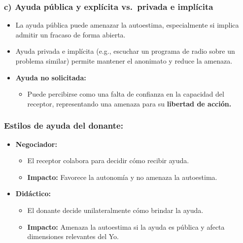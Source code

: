 \documentclass[
]{book}
\providecommand{\tightlist}{%
  \setlength{\itemsep}{0pt}\setlength{\parskip}{0pt}}
\begin{document}
\subsubsection{\texorpdfstring{\textbf{c) Ayuda pública y explícita vs.~privada e implícita}}{c) Ayuda pública y explícita vs.~privada e implícita}}\label{c-ayuda-puxfablica-y-expluxedcita-vs.-privada-e-impluxedcita}

\begin{itemize}
\tightlist
\item
  La ayuda pública puede amenazar la autoestima, especialmente si implica admitir un fracaso de forma abierta.
\item
  Ayuda privada e implícita (e.g., escuchar un programa de radio sobre un problema similar) permite mantener el anonimato y reduce la amenaza.
\item
  \textbf{Ayuda no solicitada:}

  \begin{itemize}
  \tightlist
  \item
    Puede percibirse como una falta de confianza en la capacidad del receptor, representando una amenaza para su \textbf{libertad de acción.}
  \end{itemize}
\end{itemize}

\subsubsection{\texorpdfstring{\textbf{Estilos de ayuda del donante:}}{Estilos de ayuda del donante:}}\label{estilos-de-ayuda-del-donante}

\begin{itemize}
\tightlist
\item
  \textbf{Negociador:}

  \begin{itemize}
  \tightlist
  \item
    El receptor colabora para decidir cómo recibir ayuda.\\
  \item
    \textbf{Impacto:} Favorece la autonomía y no amenaza la autoestima.\\
  \end{itemize}
\item
  \textbf{Didáctico:}

  \begin{itemize}
  \tightlist
  \item
    El donante decide unilateralmente cómo brindar la ayuda.\\
  \item
    \textbf{Impacto:} Amenaza la autoestima si la ayuda es pública y afecta dimensiones relevantes del Yo.
  \end{itemize}
\end{itemize}
\end{document}
